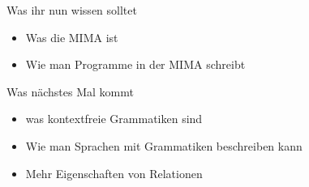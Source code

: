 \begin{frame}	
	\begin{block}{Was ihr nun wissen solltet}
		\begin{itemize}
			\item Was die MIMA ist
			\item Wie man Programme in der MIMA schreibt
		\end{itemize}
	\end{block}
	
	\begin{block}{Was nächstes Mal kommt}
		\begin{itemize}
			\item was kontextfreie Grammatiken sind
			\item Wie man Sprachen mit Grammatiken beschreiben kann
			\item Mehr Eigenschaften von Relationen
		\end{itemize}
	\end{block}
\end{frame}	


\slideThanks

